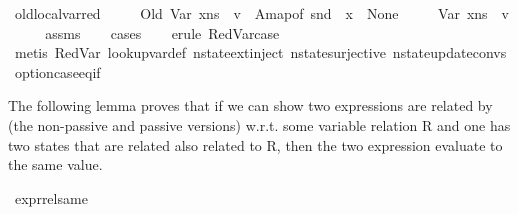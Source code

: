 \begin{isabellebody}
\ old{\isacharunderscore}{\kern0pt}local{\isacharunderscore}{\kern0pt}var{\isacharunderscore}{\kern0pt}red{\isacharcolon}{\kern0pt}\isanewline
\ \ \ {\isachardoublequoteopen}{\isasymLambda}{\isacharcomma}{\kern0pt}{\isasymGamma}{\isacharcomma}{\kern0pt}{\isasymOmega}\ {\isasymturnstile}\ {\isasymlangle}Old\ {\isacharparenleft}{\kern0pt}Var\ x{\isacharparenright}{\kern0pt}{\isacharcomma}{\kern0pt}ns{\isasymrangle}\ {\isasymDown}\ v{\isachardoublequoteclose}\ \ A{}{\isacharcolon}{\kern0pt}{\isachardoublequoteopen}map{\isacharunderscore}{\kern0pt}of\ {\isacharparenleft}{\kern0pt}snd\ {\isasymLambda}{\isacharparenright}{\kern0pt}\ x\ {\isasymnoteq}\ None{\isachardoublequoteclose}\isanewline
\ \ \ {\isachardoublequoteopen}{\isasymLambda}{\isacharcomma}{\kern0pt}{\isasymGamma}{\isacharcomma}{\kern0pt}{\isasymOmega}\ {\isasymturnstile}\ {\isasymlangle}Var\ x{\isacharcomma}{\kern0pt}ns{\isasymrangle}\ {\isasymDown}\ v{\isachardoublequoteclose}\isanewline
\ \isanewline
%
\isadelimproof
\ \ %
\endisadelimproof
%
\isatagproof
{}\isamarkupfalse%
\ assms\isanewline
\ \ \isamarkupfalse%
\ cases\isanewline
\ \ \isamarkupfalse%
\ {\isacharparenleft}{\kern0pt}erule\ RedVar{\isacharunderscore}{\kern0pt}case{\isacharparenright}{\kern0pt}\isanewline
\ \ \isamarkupfalse%
\ {\isacharparenleft}{\kern0pt}metis\ RedVar\ lookup{\isacharunderscore}{\kern0pt}var{\isacharunderscore}{\kern0pt}def\ nstate{\isachardot}{\kern0pt}ext{\isacharunderscore}{\kern0pt}inject\ nstate{\isachardot}{\kern0pt}surjective\ nstate{\isachardot}{\kern0pt}update{\isacharunderscore}{\kern0pt}convs{\isacharparenleft}{\kern0pt}{}{\isacharparenright}{\kern0pt}\ option{\isachardot}{\kern0pt}case{\isacharunderscore}{\kern0pt}eq{\isacharunderscore}{\kern0pt}if{\isacharparenright}{\kern0pt}%
\endisatagproof
{\isafoldproof}%
%
\isadelimproof
%
\endisadelimproof
%
\begin{isamarkuptext}%
The following lemma proves that if we can show two expressions are related by 
 (the non-passive and passive versions) w.r.t. some variable relation R
 and one has two states that are related also related to R, then the two expression evaluate to 
the same value.%
\end{isamarkuptext}\isamarkuptrue%
\isamarkupfalse%
\ expr{\isacharunderscore}{\kern0pt}rel{\isacharunderscore}{\kern0pt}same{\isacharcolon}{\kern0pt}\isanewline

\end{isabellebody}
